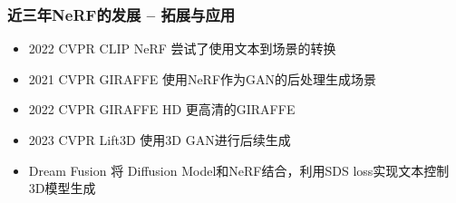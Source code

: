 \begin{frame}
    \frametitle{近三年NeRF的发展 -- 拓展与应用}
    \begin{itemize}
        \item 2022 CVPR CLIP NeRF\cite{wangCLIPNeRFTextandImageDriven2022} 尝试了使用文本到场景的转换
        \item 2021 CVPR GIRAFFE \cite{niemeyerGIRAFFERepresentingScenes2021} 使用NeRF作为GAN的后处理生成场景
        \item 2022 CVPR GIRAFFE HD \cite{xueGIRAFFEHDHighResolution2022} 更高清的GIRAFFE
        \item 2023 CVPR Lift3D \cite{liLift3DSynthesize3D2023} 使用3D GAN进行后续生成
        \item Dream Fusion \cite{pooleDreamFusionTextto3DUsing2022} 将 Diffusion Model和NeRF结合，利用SDS loss实现文本控制3D模型生成
    \end{itemize}
\end{frame}